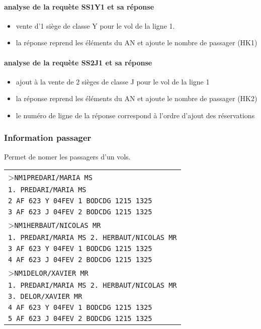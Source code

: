 \documentclass[a4paper,11pt]{article}
\begin{document}
\paragraph{analyse de la requète SS1Y1 et sa réponse} 
\begin{itemize}
	\item vente d'1 siège de classe Y pour le vol de la ligne 1.
	\item la réponse reprend les éléments du AN et ajoute le nombre de passager (HK1)
\end{itemize}
\paragraph{analyse de la requète SS2J1 et sa réponse} 
\begin{itemize}
	\item ajout à la vente de 2 sièges de classe J pour le vol de la ligne 1
	\item la réponse reprend les éléments du AN et ajoute le nombre de passager (HK2)
	\item le numéro de ligne de la réponse correspond à l'ordre d'ajout des réservations
\end{itemize}

\subsubsection*{Information passager}
Permet de nomer les passagers d'un vols.

\begin{centering}
\begin{tabular}{|p{\linewidth}|}
 \hline
>\texttt{NM1PREDARI/MARIA MS} \\	
\texttt{1. PREDARI/MARIA MS}\\
\texttt{2 AF 623 Y 04FEV 1 BODCDG 1215 1325}\\
\texttt{3 AF 623 J 04FEV 2 BODCDG 1215 1325}\\
>\texttt{NM1HERBAUT/NICOLAS MR} \\	
\texttt{1. PREDARI/MARIA MS  2. HERBAUT/NICOLAS MR}\\
\texttt{3 AF 623 Y 04FEV 1 BODCDG 1215 1325}\\
\texttt{4 AF 623 J 04FEV 2 BODCDG 1215 1325}\\
>\texttt{NM1DELOR/XAVIER MR} \\	
\texttt{1. PREDARI/MARIA MS  2. HERBAUT/NICOLAS MR}\\
\texttt{3. DELOR/XAVIER MR}\\
\texttt{4 AF 623 Y 04FEV 1 BODCDG 1215 1325}\\
\texttt{5 AF 623 J 04FEV 2 BODCDG 1215 1325}\\
   \end{tabular}
\end{centering} 
\end{document}
